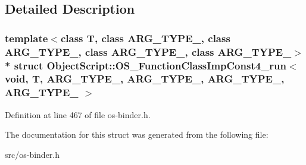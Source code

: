 \subsection{Detailed Description}
\subsubsection*{template$<$class T, class A\+R\+G\+\_\+\+T\+Y\+P\+E\+\_, class A\+R\+G\+\_\+\+T\+Y\+P\+E\+\_, class A\+R\+G\+\_\+\+T\+Y\+P\+E\+\_, class A\+R\+G\+\_\+\+T\+Y\+P\+E\+\_$>$\\*
struct Object\+Script\+::\+O\+S\+\_\+\+Function\+Class\+Imp\+Const4\+\_\+run$<$ void, T,   A\+R\+G\+\_\+\+T\+Y\+P\+E\+\_, A\+R\+G\+\_\+\+T\+Y\+P\+E\+\_, A\+R\+G\+\_\+\+T\+Y\+P\+E\+\_, A\+R\+G\+\_\+\+T\+Y\+P\+E\+\_ $>$}



Definition at line 467 of file os-\/binder.\+h.



The documentation for this struct was generated from the following file\+:\begin{DoxyCompactItemize}
\item 
src/os-\/binder.\+h\end{DoxyCompactItemize}
